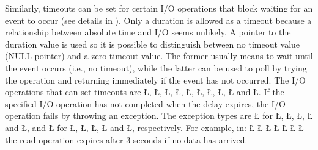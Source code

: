 \documentclass[openright,twoside]{report}
\begin{document}
Similarly, timeouts can be set for certain I/O operations that block waiting for an event to occur (see details in ).
Only a duration is allowed as a timeout because a relationship between absolute time and I/O seems unlikely.
A pointer to the duration value is used so it is possible to distinguish between no timeout value (NULL pointer) and a zero-timeout value.
The former usually means to wait until the event occurs (i.e., no timeout), while the latter can be used to poll by trying the operation and returning immediately if the event has not occurred.
The I/O operations that can set timeouts are \LGinlinetrue\LGbegin\lgrinde\L{}\endlgrinde\LGend{}, \LGinlinetrue\LGbegin\lgrinde\L{}\endlgrinde\LGend{}, \LGinlinetrue\LGbegin\lgrinde\L{}\endlgrinde\LGend{}, \LGinlinetrue\LGbegin\lgrinde\L{}\endlgrinde\LGend{}, \LGinlinetrue\LGbegin\lgrinde\L{}\endlgrinde\LGend{}, \LGinlinetrue\LGbegin\lgrinde\L{}\endlgrinde\LGend{}, \LGinlinetrue\LGbegin\lgrinde\L{}\endlgrinde\LGend{}, \LGinlinetrue\LGbegin\lgrinde\L{}\endlgrinde\LGend{}, \LGinlinetrue\LGbegin\lgrinde\L{}\endlgrinde\LGend{} and \LGinlinetrue\LGbegin\lgrinde\L{}\endlgrinde\LGend{}.
If the specified I/O operation has not completed when the delay expires, the I/O operation fails by throwing an exception.
The exception types are \LGinlinetrue\LGbegin\lgrinde\L{}\endlgrinde\LGend{} for \LGinlinetrue\LGbegin\lgrinde\L{}\endlgrinde\LGend{}, \LGinlinetrue\LGbegin\lgrinde\L{}\endlgrinde\LGend{}, \LGinlinetrue\LGbegin\lgrinde\L{}\endlgrinde\LGend{}, \LGinlinetrue\LGbegin\lgrinde\L{}\endlgrinde\LGend{} and \LGinlinetrue\LGbegin\lgrinde\L{}\endlgrinde\LGend{}, and \LGinlinetrue\LGbegin\lgrinde\L{}\endlgrinde\LGend{} for \LGinlinetrue\LGbegin\lgrinde\L{}\endlgrinde\LGend{}, \LGinlinetrue\LGbegin\lgrinde\L{}\endlgrinde\LGend{}, \LGinlinetrue\LGbegin\lgrinde\L{}\endlgrinde\LGend{}, \LGinlinetrue\LGbegin\lgrinde\L{}\endlgrinde\LGend{} and \LGinlinetrue\LGbegin\lgrinde\L{}\endlgrinde\LGend{}, respectively.
For example, in:
\LGinlinefalse\LGbegin\lgrinde
\L{}
\L{\LB{}}
\CE{}\L{\LB{}}
\L{\LB{}}
\CE{}\L{}
\L{\LB{}}
\CE{}\L{\LB{\}}}
\endlgrinde\LGend
the read operation expires after 3 seconds if no data has arrived.
\end{document}

